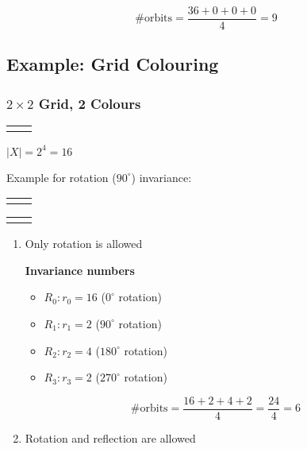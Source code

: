 \documentclass[11pt]{article}
\begin{document}
\[ \#\text{orbits} = \frac{36 + 0 + 0 + 0}{4} = 9 \]

\subsection{Example: Grid Colouring}

\subsubsection{$ 2 \times 2 $ Grid, 2 Colours}

\begin{tabular}{| c | c |}
\hline
& \\
\hline
& \\
\hline
\end{tabular} \newline

$ | X | = 2^4 = 16 $

Example for rotation ($90^\circ$) invariance:

\begin{tabular}{| c | c |}
\hline
\cellcolor{darkblue} & \cellcolor{darkblue} \\
\hline
\cellcolor{darkgreen} & \cellcolor{darkblue} \\
\hline
\end{tabular}
\hspace{1em}
\begin{tabular}{| c | c |}
\hline
\cellcolor{darkgreen} & \cellcolor{darkblue} \\
\hline
\cellcolor{darkblue} & \cellcolor{darkblue} \\
\hline
\end{tabular}

\begin{enumerate}
\item Only rotation is allowed
	
\textbf{Invariance numbers}
    \begin{itemize}
    \item $ R_0: r_0 = 16 $ ($ 0^\circ $ rotation)
    \item $ R_1: r_1 = 2 $ ($ 90^\circ $ rotation)
    \item $ R_2: r_2 = 4 $ ($ 180^\circ $ rotation)
    \item $ R_3: r_3 = 2 $ ($ 270^\circ $ rotation)
    \end{itemize}

\[ \#\text{orbits} = \frac{16 + 2 + 4 + 2}{4} = \frac{24}{4} = 6 \]
\item Rotation and reflection are allowed


\end{enumerate}
\end{document}
